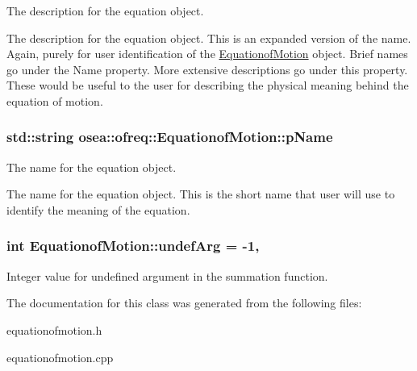 The description for the equation object. 

The description for the equation object. This is an expanded version of the name. Again, purely for user identification of the \hyperlink{classosea_1_1ofreq_1_1_equationof_motion}{Equationof\-Motion} object. Brief names go under the Name property. More extensive descriptions go under this property. These would be useful to the user for describing the physical meaning behind the equation of motion. \hypertarget{classosea_1_1ofreq_1_1_equationof_motion_a5848a1ad14d31556fd1b62b4e3de3643}{
\subsubsection[{p\-Name}]{\setlength{\rightskip}{0pt plus 5cm}std\-::string osea\-::ofreq\-::\-Equationof\-Motion\-::p\-Name\hspace{0.3cm}{\ttfamily [protected]}}}\label{classosea_1_1ofreq_1_1_equationof_motion_a5848a1ad14d31556fd1b62b4e3de3643}


The name for the equation object. 

The name for the equation object. This is the short name that user will use to identify the meaning of the equation. \hypertarget{classosea_1_1ofreq_1_1_equationof_motion_ad00063eabf1b5075b04c6d2507acebd4}{
\subsubsection[{undef\-Arg}]{\setlength{\rightskip}{0pt plus 5cm}int Equationof\-Motion\-::undef\-Arg = -\/1\hspace{0.3cm}{\ttfamily [static]}, {\ttfamily [protected]}}}\label{classosea_1_1ofreq_1_1_equationof_motion_ad00063eabf1b5075b04c6d2507acebd4}
Integer value for undefined argument in the summation function. 

The documentation for this class was generated from the following files\-:\begin{DoxyCompactItemize}
\item 
equationofmotion.\-h\item 
equationofmotion.\-cpp\end{DoxyCompactItemize}
